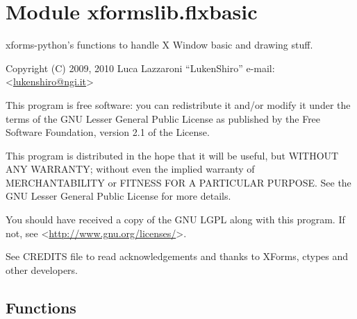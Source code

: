 %
%
%


\section{Module xformslib.flxbasic}

    \label{xformslib:flxbasic}

xforms-python's functions to handle X Window basic and drawing stuff.

Copyright (C) 2009, 2010  Luca Lazzaroni ``LukenShiro''
e-mail: <\href{mailto:lukenshiro@ngi.it}{lukenshiro@ngi.it}>

This program is free software: you can redistribute it and/or modify
it under the terms of the GNU Lesser General Public License as
published by the Free Software Foundation, version 2.1 of the License.

This program is distributed in the hope that it will be useful,
but WITHOUT ANY WARRANTY; without even the implied warranty of
MERCHANTABILITY or FITNESS FOR A PARTICULAR PURPOSE. See the
GNU Lesser General Public License for more details.

You should have received a copy of the GNU LGPL along with this
program. If not, see <\href{http://www.gnu.org/licenses/}{http://www.gnu.org/licenses/}>.

See CREDITS file to read acknowledgements and thanks to XForms,
ctypes and other developers.


  \subsection{Functions}

    \label{xformslib:flxbasic:FL_is_gray}

